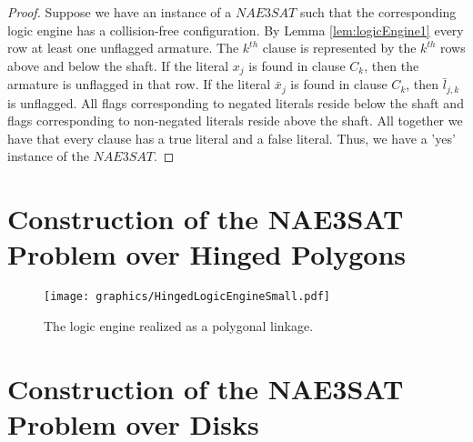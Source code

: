 \begin{proof}
Suppose we have an instance of a $NAE3SAT$ such that the corresponding logic engine has a 
collision-free configuration. By Lemma \ref{lem:logicEngine1} every row at least one unflagged 
armature.  The $k^{th}$ clause is represented by the $k^{th}$ rows above and below the shaft. If the 
literal $x_j$ is found in clause $C_k$, then the armature is unflagged in that row. If the literal 
$\bar{x}_j$ is found in clause $C_k$, then $\bar{l}_{j,k}$ is unflagged.  All flags 
corresponding to negated literals reside below the shaft and flags corresponding to non-negated 
literals reside above the shaft.  All together we have that every clause has a true literal and a 
false literal.  Thus, we have a 'yes' instance of the $NAE3SAT$.
%
%
%
\end{proof}

\section{Construction of the NAE3SAT Problem over Hinged Polygons}         
\begin{figure}[!htbp]
\begin{center}
\texttt{[image: graphics/HingedLogicEngineSmall.pdf]}
\caption{The logic engine realized as a polygonal linkage.}\label{fig:HingedLogicEngineSmall.pdf}
\end{center}
\end{figure}
\section{Construction of the NAE3SAT Problem over Disks}
